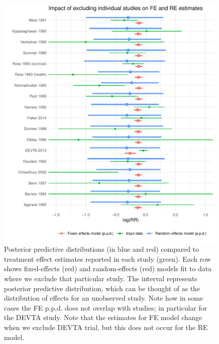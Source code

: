 \documentclass[12pt]{article}
\begin{document}
\begin{figure}[h!]
\centering
\includegraphics{baggr-oos-ppc.pdf}
\caption{Posterior predictive distributions (in blue and red) compared to treatment effect estimates reported in each study (green). Each row shows fixed-effects (red) and random-effects (red) models fit to data where we exclude that particular study. The interval represents posterior predictive distribution, which can be thought of as the distribution of effects for an unobserved study. Note how in some cases the FE p.p.d. does not overlap with studies; in particular for the DEVTA study. Note that the estimates for FE model change when we exclude DEVTA trial, but this does not occur for the RE model.} \label{baggr-oos-ppc}
\end{figure}
\end{document}
